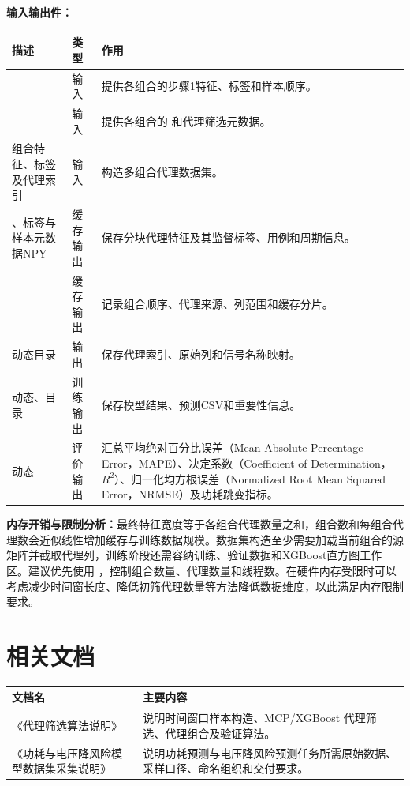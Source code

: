 \textbf{输入输出件：}
\begin{longtable}{L{0.34\textwidth}L{0.13\textwidth}L{0.41\textwidth}}
\toprule 描述 & 类型 & 作用 \\ \midrule
{} & 输入 & 提供各组合的步骤1特征、标签和样本顺序。 \\
 & 输入 & 提供各组合的  和代理筛选元数据。 \\
组合特征、标签及代理索引 & 输入 & 构造多组合代理数据集。 \\
、标签与样本元数据NPY & 缓存输出 & 保存分块代理特征及其监督标签、用例和周期信息。 \\
 & 缓存输出 & 记录组合顺序、代理来源、列范围和缓存分片。 \\
动态目录 & 输出 & 保存代理索引、原始列和信号名称映射。 \\
动态、目录 & 训练输出 & 保存模型结果、预测CSV和重要性信息。 \\
动态 & 评价输出 & 汇总平均绝对百分比误差（Mean Absolute Percentage Error，MAPE）、决定系数（Coefficient of Determination，$R^2$）、归一化均方根误差（Normalized Root Mean Squared Error，NRMSE）及功耗跳变指标。 \\
\bottomrule
\end{longtable}

\textbf{内存开销与限制分析：}最终特征宽度等于各组合代理数量之和，组合数和每组合代理数会近似线性增加缓存与训练数据规模。数据集构造至少需要加载当前组合的源矩阵并截取代理列，训练阶段还需容纳训练、验证数据和XGBoost直方图工作区。建议优先使用 ，控制组合数量、代理数量和线程数。在硬件内存受限时可以考虑减少时间窗长度、降低初筛代理数量等方法降低数据维度，以此满足内存限制要求。



\chapter{相关文档}

\begin{longtable}{L{0.40\textwidth}L{0.48\textwidth}}
\toprule 文档名 & 主要内容 \\ \midrule
《代理筛选算法说明》 & 说明时间窗口样本构造、MCP/XGBoost 代理筛选、代理组合及验证算法。 \\
《功耗与电压降风险模型数据集采集说明》 & 说明功耗预测与电压降风险预测任务所需原始数据、采样口径、命名组织和交付要求。 \\
\bottomrule
\end{longtable}

